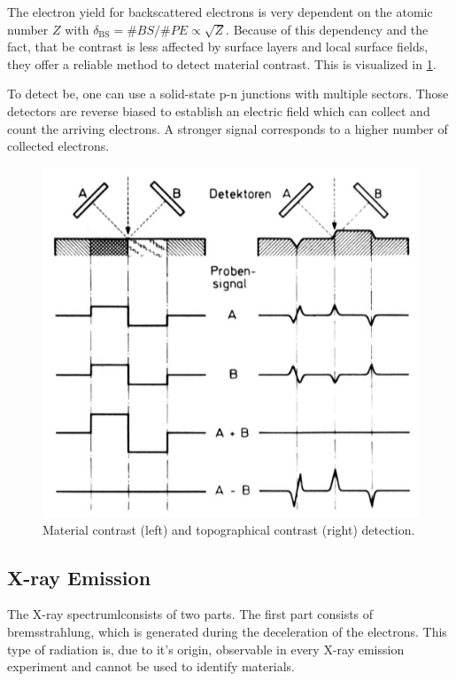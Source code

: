 The electron yield for backscattered electrons is very dependent on
the atomic number $Z$ with $\delta_\text{BS} = \# BS / \# PE
	\propto \sqrt{Z}$.
Because of this dependency and the fact, that \ac{be}
contrast is less affected by surface layers and local surface fields,
they offer a reliable
method to detect material contrast.
This is visualized in \cref{fig:material_contrast}.

To detect \ac{be}, one can use a solid-state p-n
junctions with multiple sectors.
Those detectors are reverse biased to establish an electric field which
can collect and count the arriving electrons.
A stronger signal corresponds to a higher number of collected electrons.
\begin{figure}[H]
	\centering
	\includegraphics[width=0.95\linewidth]{../assets/material.png}
	\caption{Material contrast (left) and topographical contrast (right) detection.
		}
	\label{fig:material_contrast}
\end{figure}

\subsection{X-ray Emission}
The X-ray spectrumlconsists of two parts.
The first part consists of bremsstrahlung, which is generated during the
deceleration of the electrons.
This type of radiation is, due to it's origin, observable in every X-ray
emission experiment and cannot be used to identify materials.

